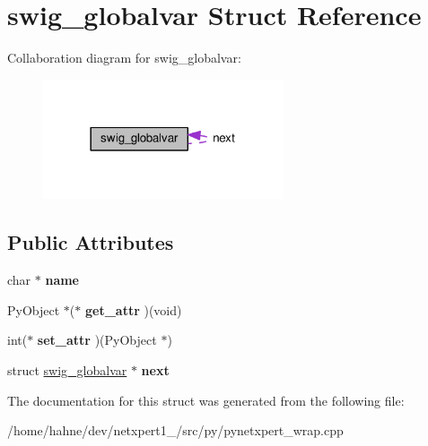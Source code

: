 \hypertarget{structswig__globalvar}{}\section{swig\+\_\+globalvar Struct Reference}
\label{structswig__globalvar}


Collaboration diagram for swig\+\_\+globalvar\+:\nopagebreak
\begin{figure}[H]
\begin{center}
\leavevmode
\includegraphics[width=201pt]{structswig__globalvar__coll__graph}
\end{center}
\end{figure}
\subsection*{Public Attributes}
\begin{DoxyCompactItemize}
\item 
char $\ast$ {\bfseries name}\hypertarget{structswig__globalvar_a32fcb5efb741f97e5c53e1a253cafdd9}{}\label{structswig__globalvar_a32fcb5efb741f97e5c53e1a253cafdd9}

\item 
Py\+Object $\ast$($\ast$ {\bfseries get\+\_\+attr} )(void)\hypertarget{structswig__globalvar_ab617d0ca02f7660a9e5fd31dceaf6475}{}\label{structswig__globalvar_ab617d0ca02f7660a9e5fd31dceaf6475}

\item 
int($\ast$ {\bfseries set\+\_\+attr} )(Py\+Object $\ast$)\hypertarget{structswig__globalvar_acff619325c0e354df88508d64c1608e6}{}\label{structswig__globalvar_acff619325c0e354df88508d64c1608e6}

\item 
struct \hyperlink{structswig__globalvar}{swig\+\_\+globalvar} $\ast$ {\bfseries next}\hypertarget{structswig__globalvar_a6b7f8fdec3a5c39a52b33c916d7ba028}{}\label{structswig__globalvar_a6b7f8fdec3a5c39a52b33c916d7ba028}

\end{DoxyCompactItemize}


The documentation for this struct was generated from the following file\+:\begin{DoxyCompactItemize}
\item 
/home/hahne/dev/netxpert1\+\_/src/py/pynetxpert\+\_\+wrap.\+cpp\end{DoxyCompactItemize}
